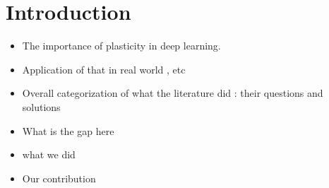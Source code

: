 \section{Introduction}


\begin{itemize}
    \item The importance of plasticity in deep learning.
    \item Application of that in real world , etc
    \item Overall categorization of what the literature did : their questions and solutions
    \item What is the gap here
    \item what we did
    \item Our contribution
\end{itemize}